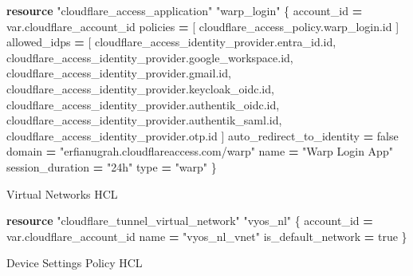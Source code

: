 \documentclass[
]{article}
\newenvironment{Shaded}{\begin{snugshade}}{\end{snugshade}}
\newcommand{\KeywordTok}[1]{\textcolor[rgb]{0.13,0.29,0.53}{\textbf{#1}}}
\newcommand{\NormalTok}[1]{#1}
\newcommand{\OperatorTok}[1]{\textcolor[rgb]{0.81,0.36,0.00}{\textbf{#1}}}
\newcommand{\StringTok}[1]{\textcolor[rgb]{0.31,0.60,0.02}{#1}}
\newcommand{\VariableTok}[1]{\textcolor[rgb]{0.00,0.00,0.00}{#1}}
\begin{document}
\begin{Shaded}
\begin{Highlighting}[numbers=left,,]
\KeywordTok{resource} \StringTok{"cloudflare\_access\_application"} \StringTok{"warp\_login"}\NormalTok{ \{}
\NormalTok{  account\_id }\OperatorTok{=} \VariableTok{var}\NormalTok{.cloudflare\_account\_id}
\NormalTok{  policies }\OperatorTok{=}\NormalTok{ [}
\NormalTok{    cloudflare\_access\_policy.warp\_login.id}
\NormalTok{  ]}
\NormalTok{  allowed\_idps }\OperatorTok{=}\NormalTok{ [}
\NormalTok{    cloudflare\_access\_identity\_provider.entra\_id.id,}
\NormalTok{    cloudflare\_access\_identity\_provider.google\_workspace.id,}
\NormalTok{    cloudflare\_access\_identity\_provider.gmail.id,}
\NormalTok{    cloudflare\_access\_identity\_provider.keycloak\_oidc.id,}
\NormalTok{    cloudflare\_access\_identity\_provider.authentik\_oidc.id,}
\NormalTok{    cloudflare\_access\_identity\_provider.authentik\_saml.id,}
\NormalTok{    cloudflare\_access\_identity\_provider.otp.id}
\NormalTok{  ]}
\NormalTok{  auto\_redirect\_to\_identity }\OperatorTok{=} \VariableTok{false}
\NormalTok{  domain                    }\OperatorTok{=} \StringTok{"erfianugrah.cloudflareaccess.com/warp"}
\NormalTok{  name                      }\OperatorTok{=} \StringTok{"Warp Login App"}
\NormalTok{  session\_duration          }\OperatorTok{=} \StringTok{"24h"}
\NormalTok{  type                      }\OperatorTok{=} \StringTok{"warp"}
\NormalTok{\}}
\end{Highlighting}
\end{Shaded}

Virtual Networks HCL

\begin{Shaded}
\begin{Highlighting}[numbers=left,,]
\KeywordTok{resource} \StringTok{"cloudflare\_tunnel\_virtual\_network"} \StringTok{"vyos\_nl"}\NormalTok{ \{}
\NormalTok{  account\_id }\OperatorTok{=} \VariableTok{var}\NormalTok{.cloudflare\_account\_id}
\NormalTok{  name       }\OperatorTok{=} \StringTok{"vyos\_nl\_vnet"}
\NormalTok{  is\_default\_network }\OperatorTok{=} \VariableTok{true}
\NormalTok{\}}
\end{Highlighting}
\end{Shaded}

\newpage{}

Device Settings Policy HCL
\end{document}
